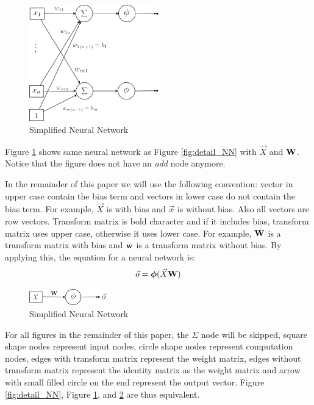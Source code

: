 \documentclass[draft,dvipsnames]{drexel-thesis}
\begin{document}
\begin{thesis}
\begin{figure}[t!]
    \centering
    \includegraphics[width=0.5\textwidth]{pictures/figures/detail_NN_with_bias.png}
    \caption{Simplified Neural Network}
    \label{fig:withoutBiasNN}
\end{figure}

Figure \ref{fig:withoutBiasNN} shows same neural network as Figure \ref{fig:detail_NN} with $\vec{X}$ and $\bold{W}$. Notice that the figure does not have an {\em add} node anymore.

In the remainder of this paper we will use the following convention: vector in upper case contain the bias term and vectors in lower case do not contain the bias term. For example, $\vec{X}$ is with bias and $\vec{x}$ is without bias. Also all vectors are row vectors. Transform matrix is bold character and if it includes bias, transform matrix uses upper case, otherwise it uses lower case. For example, $\bold{W}$ is a transform matrix with bias and $\bold{w}$ is a transform matrix without bias. By applying this, the equation for a neural network is:
$$\vec{o} = \bm{\phi}(\vec{X}\bold{W})$$

\begin{figure}[t!]
    \centering
    \includegraphics[width=0.3\textwidth]{pictures/figures/NN.png}
    \caption{Simplified Neural Network}
    \label{fig:NN}
\end{figure}

	For all figures in the remainder of this paper, the $\Sigma$ node will be skipped, square shape nodes represent input nodes, circle shape nodes represent computation nodes, edges with transform matrix represent the weight matrix, edges without transform matrix represent the identity matrix as the weight matrix and arrow with small filled circle on the end represent the output vector. Figure \ref{fig:detail_NN}, Figure \ref{fig:withoutBiasNN}, and \ref{fig:NN} are thus equivalent.



\end{thesis}
\end{document}

